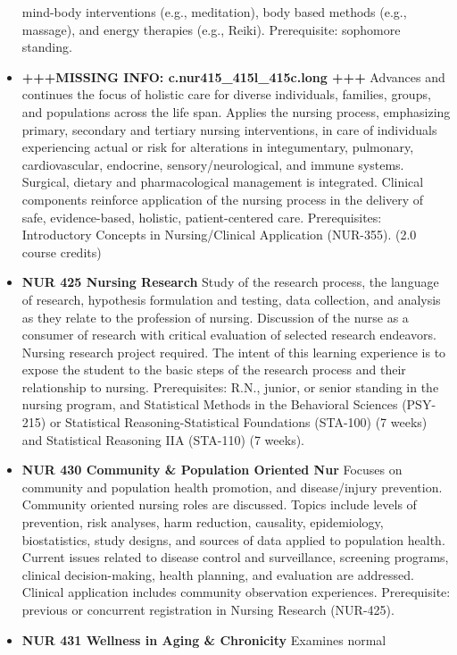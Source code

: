 \documentclass[
  letterpaper,
]{scrbook}
\begin{document}
\begin{itemize}
  mind-body interventions (e.g., meditation), body based methods (e.g.,
  massage), and energy therapies (e.g., Reiki). Prerequisite: sophomore
  standing.
\item
  \textbf{+++MISSING INFO: c.nur415\_415l\_415c.long +++} Advances and
  continues the focus of holistic care for diverse individuals,
  families, groups, and populations across the life span. Applies the
  nursing process, emphasizing primary, secondary and tertiary nursing
  interventions, in care of individuals experiencing actual or risk for
  alterations in integumentary, pulmonary, cardiovascular, endocrine,
  sensory/neurological, and immune systems. Surgical, dietary and
  pharmacological management is integrated. Clinical components
  reinforce application of the nursing process in the delivery of safe,
  evidence-based, holistic, patient-centered care. Prerequisites:
  Introductory Concepts in Nursing/Clinical Application (NUR-355). (2.0
  course credits)
\item
  \textbf{NUR 425 Nursing Research} Study of the research process, the
  language of research, hypothesis formulation and testing, data
  collection, and analysis as they relate to the profession of nursing.
  Discussion of the nurse as a consumer of research with critical
  evaluation of selected research endeavors. Nursing research project
  required. The intent of this learning experience is to expose the
  student to the basic steps of the research process and their
  relationship to nursing. Prerequisites: R.N., junior, or senior
  standing in the nursing program, and Statistical Methods in the
  Behavioral Sciences (PSY-215) or Statistical Reasoning-Statistical
  Foundations (STA-100) (7 weeks) and Statistical Reasoning IIA
  (STA-110) (7 weeks).
\item
  \textbf{NUR 430 Community \& Population Oriented Nur} Focuses on
  community and population health promotion, and disease/injury
  prevention. Community oriented nursing roles are discussed. Topics
  include levels of prevention, risk analyses, harm reduction,
  causality, epidemiology, biostatistics, study designs, and sources of
  data applied to population health. Current issues related to disease
  control and surveillance, screening programs, clinical
  decision-making, health planning, and evaluation are addressed.
  Clinical application includes community observation experiences.
  Prerequisite: previous or concurrent registration in Nursing Research
  (NUR-425).
\item
  \textbf{NUR 431 Wellness in Aging \& Chronicity} Examines normal

\end{itemize}
\end{document}
